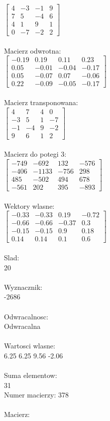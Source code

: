 \documentclass[a4paper,12pt]{article}
\begin{document}
$\begin{bmatrix} 4&-3&-1&9\\7&5&-4&6\\4&1&9&1\\0&-7&-2&2 \end{bmatrix}$
\\
\\
Macierz odwrotna:\\

$\begin{bmatrix} -0.19&0.19&0.11&0.23\\0.05&-0.01&-0.04&-0.17\\0.05&-0.07&0.07&-0.06\\0.22&-0.09&-0.05&-0.17 \end{bmatrix}$
\\
\\
Macierz transponowana:\\

$\begin{bmatrix} 4&7&4&0\\-3&5&1&-7\\-1&-4&9&-2\\9&6&1&2 \end{bmatrix}$
\\
\\
Macierz do potegi 3:\\

$\begin{bmatrix} -749&-692&132&-576\\-406&-1133&-756&298\\485&-502&494&678\\-561&202&395&-893 \end{bmatrix}$
\\
\\
Wektory wlasne:\\

$\begin{bmatrix} -0.33&-0.33&0.19&-0.72\\-0.66&-0.66&-0.37&0.3\\-0.15&-0.15&0.9&0.18\\0.14&0.14&0.1&0.6 \end{bmatrix}$
\\
\\
Slad:\\
20
\\
\\
Wyznacznik:\\
-2686
\\
\\
Odwracalnosc:\\
Odwracalna
\\
\\
Wartosci wlasne:\\
6.25 6.25 9.56 -2.06
\\
\\
Suma elementow:\\
31
\\
\newpage
Numer macierzy:
378
\\
\\
Macierz:\\
\end{document}
